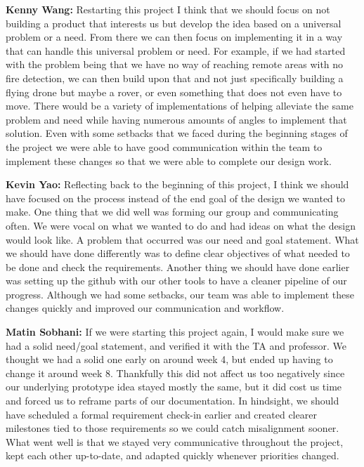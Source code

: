 \documentclass[journal, onecolumn]{IEEEtran}
\begin{document}
\textbf{Kenny Wang:} Restarting this project I think that we should focus on not building a product that interests us but develop the idea based on a universal problem or a need. From there we can then focus on implementing it in a way that can handle this universal problem or need. For example, if we had started with the problem being that we have no way of reaching remote areas with no fire detection, we can then build upon that and not just specifically building a flying drone but maybe a rover, or even something that does not even have to move. There would be a variety of implementations of helping alleviate the same problem and need while having numerous amounts of angles to implement that solution. Even with some setbacks that we faced during the beginning stages of the project we were able to have good communication within the team to implement these changes so that we were able to complete our design work.

\vspace{1em}

\textbf{Kevin Yao:} Reflecting back to the beginning of this project, I think we should have focused on the process instead of the end goal of the design we wanted to make. One thing that we did well was forming our group and communicating often. We were vocal on what we wanted to do and had ideas on what the design would look like. A problem that occurred was our need and goal statement. What we should have done differently was to define clear objectives of what needed to be done and check the requirements. Another thing we should have done earlier was setting up the github with our other tools to have a cleaner pipeline of our progress. Although we had some setbacks, our team was able to implement these changes quickly and improved our communication and workflow.

\vspace{1em}

\textbf{Matin Sobhani:} If we were starting this project again, I would make sure we had a solid need/goal statement, and verified it with the TA and professor. We thought we had a solid one early on around week 4, but ended up having to change it around week 8. Thankfully this did not affect us too negatively since our underlying prototype idea stayed mostly the same, but it did cost us time and forced us to reframe parts of our documentation. In hindsight, we should have scheduled a formal requirement check-in earlier and created clearer milestones tied to those requirements so we could catch misalignment sooner. What went well is that we stayed very communicative throughout the project, kept each other up-to-date, and adapted quickly whenever priorities changed.
\end{document}

